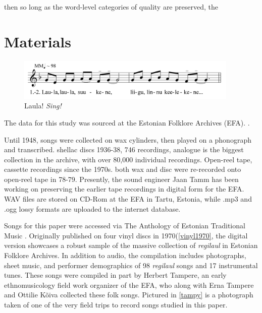 then so long as the word-level categories of quality are preserved, the 


\section{Materials}

\begin{figure}[htbp]
\centering
\includegraphics[width=300pt]{figures/055.png}
\caption{Laula! {\it Sing!}}
\label{default}
\end{figure}




The data for this study was sourced at the Estonian Folklore Archives (EFA). 
\citep{orasEstonianFolkloreArchives2022a}.



Until 1948, songs were collected on wax cylinders, then played on a phonograph and transcribed. shellac discs 1936-38, 746 recordings, 
analogue is the biggest collection in the archive, with over 80,000 individual recordings. Open-reel tape, cassette recordings since the 1970s. 
both wax and disc were re-recorded onto open-reel tape in 78-79.
Presently, the sound engineer Jaan Tamm has been working on preserving the earlier tape recordings in digital form for the EFA. WAV files are stored on CD-Rom at the EFA in Tartu, Estonia, while .mp3 and .ogg lossy formats are uploaded to the internet database. 
%
%




Songs for this paper were accessed via The Anthology of Estonian Traditional Music \citep{tampereAnthologyEstonianTraditional2016}. Originally published on four vinyl discs in 1970(\ref{vinyl1970}, the digital version showcases a robust sample of the massive collection of {\it regilaul} in Estonian Folklore Archives. In addition to audio, the  compilation includes  photographs, sheet music, and performer demographics of 98 {\it regilaul} songs and 17 instrumental tunes. 
These songs were compiled in part by Herbert Tampere, an early ethnomusicology field work organizer of the EFA, who along with Erna Tampere and Ottilie Kõiva collected these folk songs. Pictured in \ref{tampy} is a photograph taken of one of the very field trips to record songs studied in this paper. 

